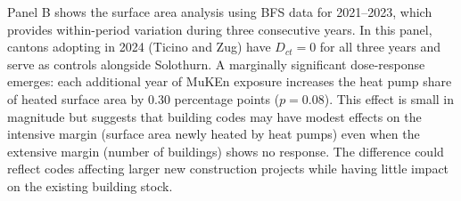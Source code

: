 \documentclass[12pt]{article}
\begin{document}
Panel B shows the surface area analysis using BFS data for 2021--2023, which provides within-period variation during three consecutive years. In this panel, cantons adopting in 2024 (Ticino and Zug) have $D_{ct} = 0$ for all three years and serve as controls alongside Solothurn. A marginally significant dose-response emerges: each additional year of MuKEn exposure increases the heat pump share of heated surface area by 0.30 percentage points ($p = 0.08$). This effect is small in magnitude but suggests that building codes may have modest effects on the intensive margin (surface area newly heated by heat pumps) even when the extensive margin (number of buildings) shows no response. The difference could reflect codes affecting larger new construction projects while having little impact on the existing building stock.
\end{document}

